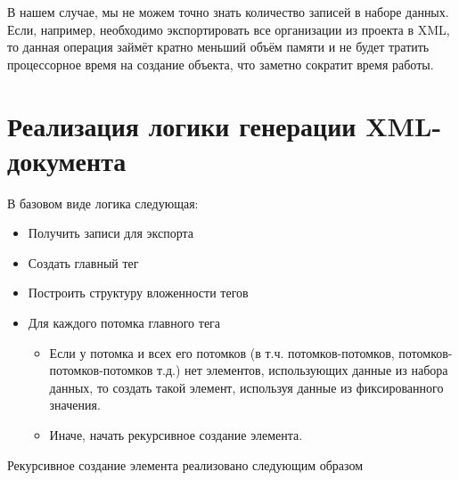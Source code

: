 \documentclass[a4paper,12pt]{diplom}
\begin{document}
В нашем случае, мы не можем точно знать количество записей в наборе данных. Если, например, необходимо экспортировать все организации из проекта в XML, то данная операция займёт кратно меньший объём памяти и не будет тратить процессорное время на создание объекта, что заметно сократит время работы.

\section{Реализация логики генерации XML-документа}

В базовом виде логика следующая:

\begin{itemize}
    \item Получить записи для экспорта
    \item Создать главный тег
    \item Построить структуру вложенности тегов
    \item Для каждого потомка главного тега
        \begin{itemize}
            \item Если у потомка и всех его потомков (в т.ч. потомков-потомков, потомков-потомков-потомков т.д.) нет элементов, использующих данные из набора данных, то создать такой элемент, используя данные из фиксированного значения.
            \item Иначе, начать рекурсивное создание элемента.
        \end{itemize}
\end{itemize}

Рекурсивное создание элемента реализовано следующим образом
\end{document}
